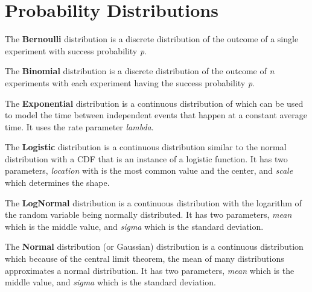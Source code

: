 \section{Probability Distributions}

\newcommand{\distname}[1]{\textbf{#1}}

\newcommand{\distattrib}[1]{\textit{#1}}


The \distname{Bernoulli} distribution is a discrete distribution of
the outcome of a single experiment with success probability
\distattrib{p}.


The \distname{Binomial} distribution is a discrete distribution of the
outcome of \distattrib{n} experiments with each experiment having the
success probability \distattrib{p}.


The \distname{Exponential} distribution is a continuous distribution
of which can be used to model the time between independent events that
happen at a constant average time.  It uses the rate parameter
\distattrib{lambda}.


The \distname{Logistic} distribution is a continuous distribution
similar to the normal distribution with a CDF that is an instance of a
logistic function.  It has two parameters, \distattrib{location} with
is the most common value and the center, and \distattrib{scale} which
determines the shape.


The \distname{LogNormal} distribution is a continuous distribution
with the logarithm of the random variable being normally distributed.
It has two parameters, \distattrib{mean} which is the middle value,
and \distattrib{sigma} which is the standard deviation.


The \distname{Normal} distribution (or Gaussian) distribution is a
continuous distribution which because of the central limit theorem,
the mean of many distributions approximates a normal distribution.  It
has two parameters, \distattrib{mean} which is the middle value, and
\distattrib{sigma} which is the standard deviation.

